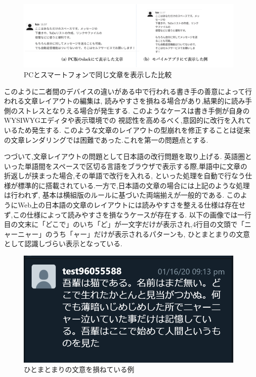 
\begin{figure}[H]
    \centering
    \label{fig:image5}
    \includegraphics[width=0.9\columnwidth]{image/01/img3.png}
    \caption[PCとスマートフォンで同じ文章を表示した比較] {PCとスマートフォンで同じ文章を表示した比較}
\end{figure}

このように二者間のデバイスの違いがある中で行われる書き手の善意によって行われる文章レイアウトの編集は,
読みやすさを損ねる場合があり,結果的に読み手側のストレスとなりえる場合が発生する.
このようなケースは書き手側が自身のWYSIWYGエディタや表示環境での
視認性を高めるべく,意図的に改行を入れているため発生する.
このような文章のレイアウトの型崩れを修正することは従来の文章レンダリングでは困難であった.これを第一の問題点とする.

つづいて,文章レイアウトの問題として日本語の改行問題を取り上げる.
英語圏といった単語間をスペースで区切る言語をブラウザで表示する際,単語中に文章の折返しが挟まった場合,その単語で改行を入れる,
といった処理を自動で行なう仕様が標準的に搭載されている.一方で,日本語の文章の場合には上記のような処理は行われず,
基本は横組版のルールに基づいた両端揃えが一般的である.
このようにWeb上の日本語の文章のレイアウトには読みやすさを整える仕様は存在せず,この仕様によって読みやすさを損なうケースが存在する.
以下の画像では一行目の文末に「どこで」のいち「ど」が一文字だけが表示され,4行目の文頭で「ニャーニャー」のうち「ャー」だけが表示されるパターンも,
ひとまとまりの文意として認識しづらい表示となっている.

\begin{figure}[H]
        \centering
        \label{fig:image5}
        \includegraphics[width=0.7\columnwidth]{image/01/img5.png}
        \caption[ひとまとまりの文意を損ねている例] {ひとまとまりの文意を損ねている例}
\end{figure}

